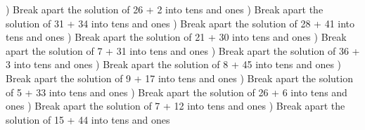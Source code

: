\documentclass{article}%
\begin{document}
\newline%
) Break apart the solution of 26 + 2 into tens and ones%
\newline%
\newline%
) Break apart the solution of 31 + 34 into tens and ones%
\newline%
\newline%
) Break apart the solution of 28 + 41 into tens and ones%
\newline%
\newline%
) Break apart the solution of 21 + 30 into tens and ones%
\newline%
\newline%
) Break apart the solution of 7 + 31 into tens and ones%
\newline%
\newline%
) Break apart the solution of 36 + 3 into tens and ones%
\newline%
\newline%
) Break apart the solution of 8 + 45 into tens and ones%
\newline%
\newline%
) Break apart the solution of 9 + 17 into tens and ones%
\newline%
\newline%
) Break apart the solution of 5 + 33 into tens and ones%
\newline%
\newline%
) Break apart the solution of 26 + 6 into tens and ones%
\newline%
\newline%
) Break apart the solution of 7 + 12 into tens and ones%
\newline%
\newline%
) Break apart the solution of 15 + 44 into tens and ones%
\newline%
\newline%
\newline%
\end{document}

